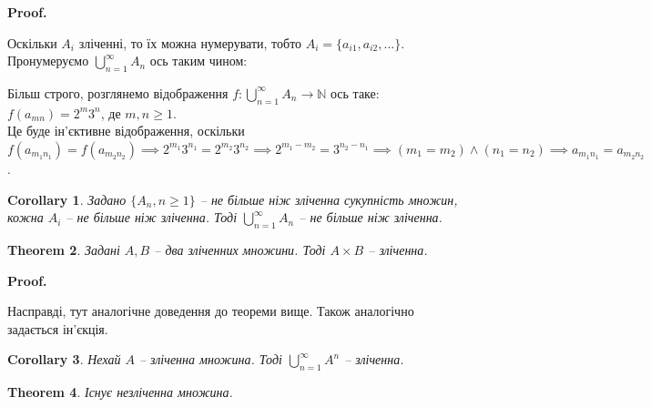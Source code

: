 \documentclass[a4paper, 14pt]{extarticle}
\makeatletter
\theoremstyle{theoremdd}
\newtheorem{theorem}{Theorem}[subsection]
\theoremstyle{theoremdd}
\theoremstyle{theoremdd}
\theoremstyle{theoremdd}
\theoremstyle{theoremdd}
\theoremstyle{theoremdd}
\theoremstyle{theoremdd}
\theoremstyle{theoremdd}
\theoremstyle{theoremdd}
\theoremstyle{theoremdd}
\theoremstyle{theoremdd}
\theoremstyle{theoremdd}
\theoremstyle{theoremdd}
\theoremstyle{theoremdd}
\newtheorem{corollary}[theorem]{Corollary}
\theoremstyle{theoremdd}
\renewenvironment{proof}[1][Proof.\\]{\par
\pushQED{\hfill \qed}%
\normalfont \topsep6\p@\@plus6\p@\relax
\trivlist
\item\relax
{\bfseries
#1\@addpunct{.}}\hspace\labelsep\ignorespaces
}{%
\popQED\endtrivlist\@endpefalse
}
\makeatother
\begin{document}
\begin{proof}
Оскільки $A_i$ зліченні, то їх можна нумерувати, тобто
$A_i = \{a_{i1},a_{i2},\dots\}$.\\
Пронумеруємо $\displaystyle\bigcup_{n=1}^\infty A_n$ ось таким чином:
\begin{figure}[H]
\centering
{}
\end{figure}
Більш строго, розглянемо відображення $f \colon \displaystyle\bigcup_{n=1}^\infty A_n \to \mathbb{N}$ ось таке: \\
$f(a_{mn}) = 2^{m} 3^{n}$, де $m,n \geq 1$. \\
Це буде ін'єктивне відображення, оскільки $f(a_{m_1n_1}) = f(a_{m_2n_2}) \implies 2^{m_1} 3^{n_1} = 2^{m_2} 3^{n_2} \implies 2^{m_1-m_2} = 3^{n_2-n_1} \implies (m_1 = m_2) \wedge (n_1 = n_2) \implies a_{m_1n_1} = a_{m_2n_2}$.
\end{proof}

\begin{corollary}
Задано $\{A_n, n \geq 1\}$ -- не більше ніж зліченна сукупність множин, кожна $A_i$ -- не більше ніж зліченна. Тоді $\displaystyle\bigcup_{n = 1}^\infty A_n$ -- не більше ніж зліченна.
\end{corollary}

\begin{theorem}
Задані $A,B$ -- два зліченних множини. Тоді $A \times B$ -- зліченна.
\end{theorem}

\begin{proof}
Насправді, тут аналогічне доведення до теореми вище. Також аналогічно задається ін'єкція.
\end{proof}

\begin{corollary}
Нехай $A$ -- зліченна множина. Тоді $\displaystyle\bigcup_{n=1}^\infty A^n$ -- зліченна.
\end{corollary}

\begin{theorem}
Існує незліченна множина.
\end{theorem}
\end{document}
